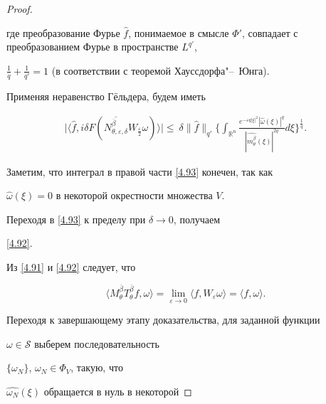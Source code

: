 \begin{proof}
\[\]

где преобразование Фурье $\widehat{f}$, понимаемое в  смысле $\Phi'$, совпадает с преобразованием Фурье в пространстве $L^{q'}$,

$\frac1q+\frac1{q'}=1$ (в соответствии с теоремой Хауссдорфа"--~Юнга).



Применяя неравенство Гёльдера, будем иметь

\begin{eqnarray}

 \bigl|\langle \widehat{f}, i\delta F(\overline{N_{\theta,\varepsilon,\delta}^{\overline{\beta}}}W_{\frac\varepsilon 2}\omega)\rangle\bigr|\leqslant\

 \delta \|\widehat{f}\|_{q'}

 \biggl\{\int_{{\mathbb R^n}} \frac{ e^{-\varepsilon q|\xi|^2}

 \left| \widehat{\omega}(\xi) \right|^q}{|\widehat{m_{\theta}^{\overline{\beta}}}(\xi)|^{2q}} d\xi\biggr\}^{\frac1q}.\label{4.93}

\end{eqnarray}

Заметим, что интеграл в правой части \eqref{4.93} конечен, так как

$\widehat{\omega}(\xi)=0$ в некоторой окрестности множества $V$.



Переходя в \eqref{4.93} к пределу  при $\delta\to 0$, получаем

\eqref{4.92}.



Из \eqref{4.91} и \eqref{4.92} следует, что

\begin{equation}\label{4.94}

  \langle M_\theta^{\overline{\beta}}T_\theta^{\overline{\beta}}f,

 \omega\rangle=\lim\limits_{\varepsilon\to 0}\langle f,

W_\varepsilon \omega\rangle= \langle f, \omega\rangle.

\end{equation}



Переходя к завершающему этапу доказательства, для заданной функции

$\omega\in \mathcal{S}$ выберем последовательность

$\{\omega_N\}$, $\omega_N\in \Phi_V$, такую, что

$\widehat{\omega_N}(\xi)$ обращается в нуль в некоторой


\end{proof}
